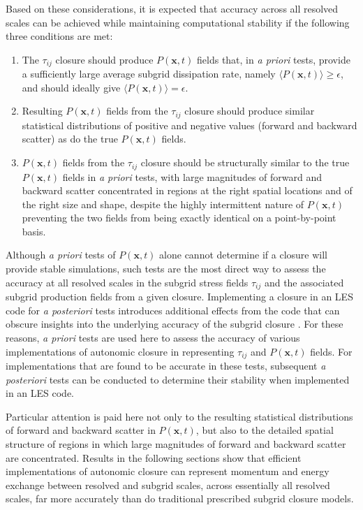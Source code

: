 Based on these considerations, it is expected that accuracy across all resolved scales can be achieved while maintaining computational stability if the following three conditions are met:
%
\begin{enumerate} 
	\item {The  $\tau_{ij}$  closure should produce  $P(\mathbf{x},t)$  fields that, in \textit{a priori} tests, provide a sufficiently large average subgrid dissipation rate, namely $\langle P(\mathbf{x},t)\rangle \geq \epsilon$, and should ideally give  $\langle P(\mathbf{x},t)\rangle = \epsilon$.}
	\item {Resulting  $P(\mathbf{x},t)$  fields from the   $\tau_{ij}$   closure should produce similar statistical distributions of positive and negative values (forward and backward scatter) as do the true $P(\mathbf{x},t)$  fields.}
	\item {$P(\mathbf{x},t)$  fields from the  $\tau_{ij}$  closure should be structurally similar to the true  $P(\mathbf{x},t)$  fields in   \textit{a priori}   tests, with large magnitudes of forward and backward scatter concentrated in regions at the right spatial locations and of the right size and shape, despite the highly intermittent nature of  $P(\mathbf{x},t)$  preventing the two fields from being exactly identical on a point-by-point basis.}
\end{enumerate}
%
%
Although   \textit{a priori}   tests of  $P(\mathbf{x},t)$  alone cannot determine if a closure will provide stable simulations, such tests are the most direct way to assess the accuracy at all resolved scales in the subgrid stress fields  $\tau_{ij}$   and the associated subgrid production fields   from a given closure. Implementing a closure in an LES code for \textit{a posteriori} tests introduces additional effects from the code that can obscure insights into the underlying accuracy of the subgrid closure \cite{meneveau2000scale}. For these reasons,   \textit{a priori}   tests are used here to assess the accuracy of various implementations of autonomic closure in representing   $\tau_{ij}$   and   $P(\mathbf{x},t)$  fields. For implementations that are found to be accurate in these tests, subsequent   \textit{a posteriori}   tests can be conducted to determine their stability when implemented in an LES code.

Particular attention is paid here not only to the resulting statistical distributions of forward and backward scatter in   $P(\mathbf{x},t)$,   but also to the detailed spatial structure of regions in which large magnitudes of forward and backward scatter are concentrated. Results in the following sections show that efficient implementations of autonomic closure can represent momentum and energy exchange between resolved and subgrid scales, across essentially all resolved scales, far more accurately than do traditional prescribed subgrid closure models. 


